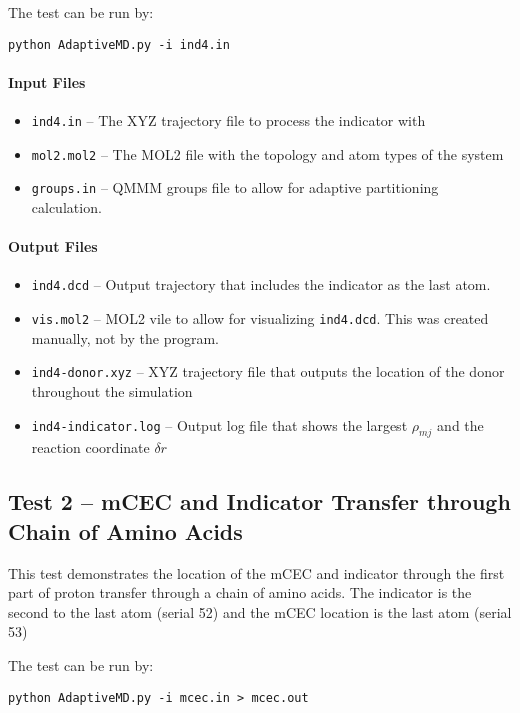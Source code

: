 \documentclass{article}
\begin{document}
The test can be run by:

\texttt{python AdaptiveMD.py -i ind4.in}

\paragraph{Input Files}
\begin{itemize}
\item \texttt{ind4.in} -- The XYZ trajectory file to process the indicator with
\item \texttt{mol2.mol2} -- The MOL2 file with the topology and atom types of the system
\item \texttt{groups.in} -- \textsc{QMMM} groups file to allow for adaptive partitioning calculation.
\end{itemize}

\paragraph{Output Files}
\begin{itemize}
\item \texttt{ind4.dcd} -- Output trajectory that includes the indicator as the last atom.
\item \texttt{vis.mol2} -- MOL2 vile to allow for visualizing \texttt{ind4.dcd}. This was created manually, not by the program.
\item \texttt{ind4-donor.xyz} -- XYZ trajectory file that outputs the location of the donor throughout the simulation
\item \texttt{ind4-indicator.log} -- Output log file that shows the largest $\rho_{mj}$ and the reaction coordinate $\delta r$
\end{itemize}

\subsection{Test 2 -- mCEC and Indicator Transfer through Chain of Amino Acids}
This test demonstrates the location of the mCEC and indicator through the first part of proton transfer through a chain of amino acids.
The indicator is the second to the last atom (serial 52) and the mCEC location is the last atom (serial 53)

The test can be run by:

\texttt{python AdaptiveMD.py -i mcec.in > mcec.out}
\end{document}
